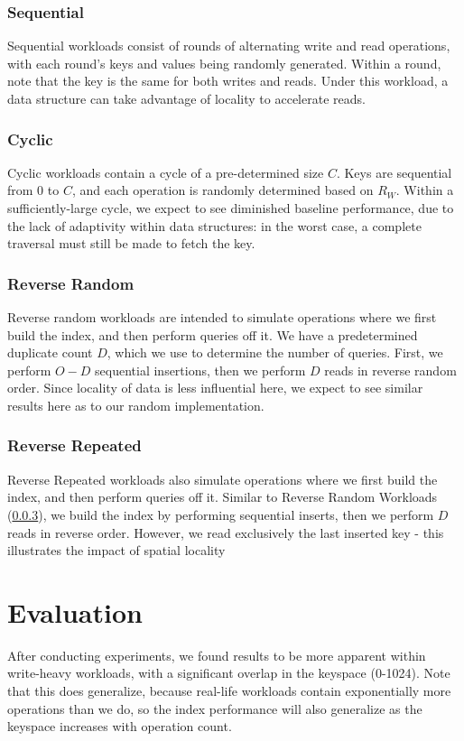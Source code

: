 \documentclass[sigconf]{acmart}
\begin{document}
\subsubsection{Sequential}
Sequential workloads consist of rounds of alternating write and read operations, with each round's keys and values being randomly generated. Within a round, note that the key is the same for both writes and reads. Under this workload, a data structure can take advantage of locality to accelerate reads.

\subsubsection{Cyclic}
Cyclic workloads contain a cycle of a pre-determined size $C$. Keys are sequential from $0$ to $C$, and each operation is randomly determined based on $R_W$. Within a sufficiently-large cycle, we expect to see diminished baseline performance, due to the lack of adaptivity within data structures: in the worst case, a complete traversal must still be made to fetch the key.

\subsubsection{Reverse Random}
\label{reverse_random}
Reverse random workloads are intended to simulate operations where we first build the index, and then perform queries off it. We have a predetermined duplicate count $D$, which we use to determine the number of queries. First, we perform $O-D$ sequential insertions, then we perform $D$ reads in reverse random order. Since locality of data is less influential here, we expect to see similar results here as to our random implementation.

\subsubsection{Reverse Repeated}
Reverse Repeated workloads also simulate operations where we first build the index, and then perform queries off it. Similar to Reverse Random Workloads (\ref{reverse_random}), we build the index by performing sequential inserts, then we perform $D$ reads in reverse order. However, we read exclusively the last inserted key - this illustrates the impact of spatial locality

\section{Evaluation}
After conducting experiments, we found results to be more apparent within write-heavy workloads, with a significant overlap in the keyspace (0-1024). Note that this does generalize, because real-life workloads contain exponentially more operations than we do, so the index performance will also generalize as the keyspace increases with operation count.
\end{document}
